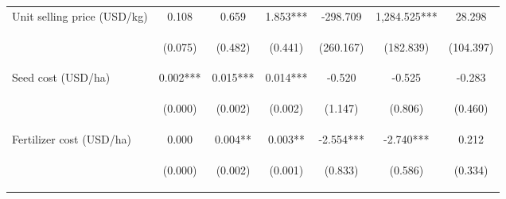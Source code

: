 \begin{center}
\begin{tabular}{lcccccc}
Unit selling price (USD/kg) & 0.108 & 0.659 & 1.853*** & -298.709 & 1,284.525*** & 28.298 \\
\vspace{4pt} & \begin{footnotesize}(0.075)\end{footnotesize} & \begin{footnotesize}(0.482)\end{footnotesize} & \begin{footnotesize}(0.441)\end{footnotesize} & \begin{footnotesize}(260.167)\end{footnotesize} & \begin{footnotesize}(182.839)\end{footnotesize} & \begin{footnotesize}(104.397)\end{footnotesize} \\
Seed cost (USD/ha) & 0.002*** & 0.015*** & 0.014*** & -0.520 & -0.525 & -0.283 \\
\vspace{4pt} & \begin{footnotesize}(0.000)\end{footnotesize} & \begin{footnotesize}(0.002)\end{footnotesize} & \begin{footnotesize}(0.002)\end{footnotesize} & \begin{footnotesize}(1.147)\end{footnotesize} & \begin{footnotesize}(0.806)\end{footnotesize} & \begin{footnotesize}(0.460)\end{footnotesize} \\
Fertilizer cost (USD/ha) & 0.000 & 0.004** & 0.003** & -2.554*** & -2.740*** & 0.212 \\
\vspace{4pt} & \begin{footnotesize}(0.000)\end{footnotesize} & \begin{footnotesize}(0.002)\end{footnotesize} & \begin{footnotesize}(0.001)\end{footnotesize} & \begin{footnotesize}(0.833)\end{footnotesize} & \begin{footnotesize}(0.586)\end{footnotesize} & \begin{footnotesize}(0.334)\end{footnotesize} \\

\end{tabular}
\end{center}
